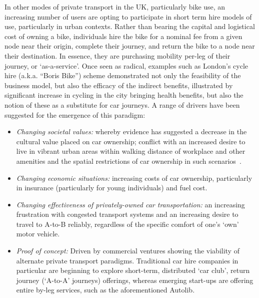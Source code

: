 \documentclass[journal]{IEEEtran}
\begin{document}
In other modes of private transport in the UK, particularly bike use,
an increasing number of users are opting to participate in short term
hire models of use, particularly in urban contexts. Rather than
bearing the capital and logistical cost of owning a bike, individuals
hire the bike for a nominal fee from a given node near their origin,
complete their journey, and return the bike to a node near their
destination. In essence, they are purchasing mobility per-leg of their
journey, or `as-a-service'. Once seen as radical, examples such as
London’s cycle hire (a.k.a. ``Boris Bike'') scheme demonstrated not
only the feasibility of the business model, but also the efficacy of
the indirect benefits, illustrated by significant increase in cycling
in the city bringing health benefits, but also the notion of these as
a substitute for car journeys. A range of drivers have been suggested
for the emergence of this paradigm:

\begin{itemize}
\item {\emph{Changing societal values:}} whereby evidence has
suggested a decrease in the cultural value placed on car ownership;
conflict with an increased desire to live in vibrant urban areas
within walking distance of workplace and other amenities and the
spatial restrictions of car ownership in such
scenarios~\cite{jenks+burgess:2011}.
\item {\emph{Changing economic situations:}} increasing costs of car
ownership, particularly in insurance (particularly for young
individuals) and fuel cost.
\item {\emph{Changing effectiveness of privately-owned car
transportation:}} an increasing frustration with congested transport
systems and an increasing desire to travel to A-to-B reliably,
regardless of the specific comfort of one's `own' motor vehicle.
\item {\emph{Proof of concept:}} Driven by commercial ventures
showing the viability of alternate private transport
paradigms. Traditional car hire companies in particular are beginning
to explore short-term, distributed `car club', return journey
(`A-to-A' journeys) offerings, whereas emerging start-ups are offering
entire by-leg services, such as the aforementioned Autolib.
\end{itemize}

\end{document}
